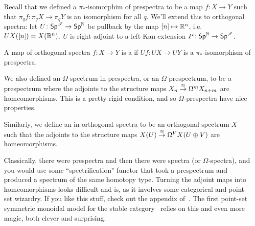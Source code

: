 Recall that we defined a $\pi_*$-isomorphim of prespectra to be a map $f\colon X\to Y$ such that $\pi_qf\colon
\pi_q X\to\pi_q Y$ is an isomorphism for all $q$. We'll extend this to orthogonal spectra: let
$U\colon\mathsf{Sp}^\mathscr I\to\mathsf{Sp}^\mathbb N$ be pullback by the map $[n]\mapsto\R^n$, i.e.\ $UX([n]) = X(\mathbb R^n)$. $U$ is right
adjoint to a left Kan extension $P\colon\mathsf{Sp}^\mathbb N\to\mathsf{Sp}^\mathscr I$.
\begin{defn}
A map of orthogonal spectra $f\colon X\to Y$ is a  if $Uf\colon UX\to UY$ is a
$\pi_*$-isomorphism of prespectra.
\end{defn}
We also defined an $\Omega$-spectrum in prespectra, or an $\Omega$-prespectrum, to be a prespectrum where the
adjoints to the structure maps $X_n\stackrel\cong\to\Omega^mX_{n+m}$ are homeomorphisms. This is a pretty rigid condition,
and so $\Omega$-prespectra have nice properties.
\begin{defn}
Similarly, we define an  in orthogonal spectra to be an orthogonal spectrum $X$ such that
the adjoints to the structure maps $X(U)\stackrel\cong\to\Omega^V X(U\oplus V)$ are homeomorphisms.
\end{defn}
Classically, there were prespectra and then there were spectra (or $\Omega$-spectra), and you would use some
``spectrification'' functor that took a prespectrum and produced a spectrum of the same homotopy type. Turning the
adjoint maps into homeomorphisms looks difficult and is, as it involves some categorical and point-set wizardry. If
you like this stuff, check out the appendix of~\cite{LMS}. The first point-set symmetric monoidal model for the
stable category~\cite{EKMM} relies on this and even more magic, both clever and surprising.

